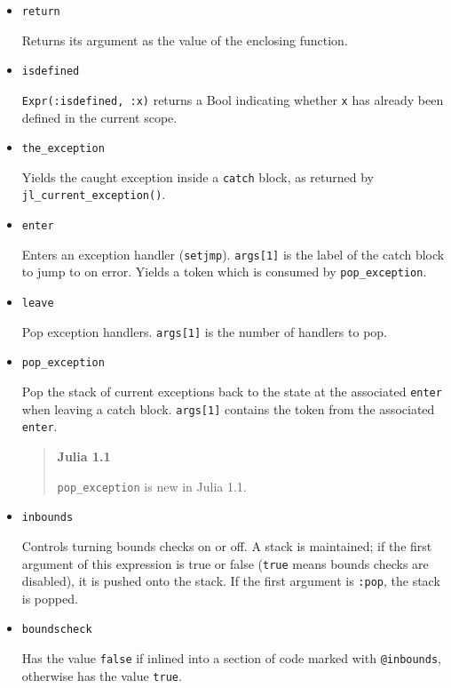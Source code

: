 \begin{itemize}
\item \texttt{return}

Returns its argument as the value of the enclosing function.


\item \texttt{isdefined}

\texttt{Expr(:isdefined, :x)} returns a Bool indicating whether \texttt{x} has already been defined in the current scope.


\item \texttt{the\_exception}

Yields the caught exception inside a \texttt{catch} block, as returned by \texttt{jl\_current\_exception()}.


\item \texttt{enter}

Enters an exception handler (\texttt{setjmp}). \texttt{args[1]} is the label of the catch block to jump to on error.  Yields a token which is consumed by \texttt{pop\_exception}.


\item \texttt{leave}

Pop exception handlers. \texttt{args[1]} is the number of handlers to pop.


\item \texttt{pop\_exception}

Pop the stack of current exceptions back to the state at the associated \texttt{enter} when leaving a catch block. \texttt{args[1]} contains the token from the associated \texttt{enter}.

\begin{quote}
\textbf{Julia 1.1}

\texttt{pop\_exception} is new in Julia 1.1.

\end{quote}

\item \texttt{inbounds}

Controls turning bounds checks on or off. A stack is maintained; if the first argument of this expression is true or false (\texttt{true} means bounds checks are disabled), it is pushed onto the stack. If the first argument is \texttt{:pop}, the stack is popped.


\item \texttt{boundscheck}

Has the value \texttt{false} if inlined into a section of code marked with \texttt{@inbounds}, otherwise has the value \texttt{true}.



\end{itemize}
